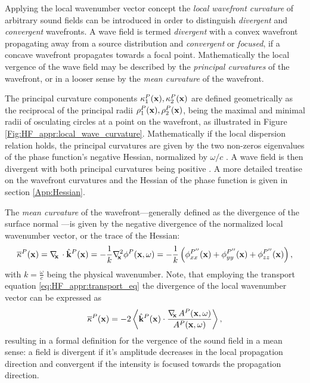 Applying the local wavenumber vector concept the \emph{local wavefront curvature} of arbitrary sound fields can be introduced in order to distinguish \emph{divergent} and \emph{convergent} wavefronts.
A wave field is termed \emph{divergent} with a convex wavefront propagating away from a source distribution and \emph{convergent} or \emph{focused}, if a concave wavefront propagates towards a focal point.
Mathematically the local vergence of the wave field may be described by the \emph{principal curvatures} of the wavefront, or in a looser sense by the \emph{mean curvature} of the wavefront.

The principal curvature components $\kappa_1^P(\mathbf{x}),\kappa_2^P(\mathbf{x})$ are defined geometrically as the reciprocal of the principal radii $\rho_1^P(\mathbf{x}), \rho_2^P(\mathbf{x})$, being the maximal and minimal radii of osculating circles at a point on the wavefront, as illustrated in Figure \ref{Fig:HF_appr:local_wave_curvature}.
Mathematically if the local dispersion relation holds, the principal curvatures are given by the two non-zeros eigenvalues of the phase function's negative Hessian, normalized by $\omega/c$ \cite{Hartmann1999, Hartmann2001}.
A wave field is then divergent with both principal curvatures being positive \cite{Arnold1986, Bleistein1984, HF_and_Pulse_Scattering1992}.
A more detailed treatise on the wavefront curvatures and the Hessian of the phase function is given in section \ref{App:Hessian}.

The \emph{mean curvature} of the wavefront---generally defined as the divergence of the surface normal \cite{Goldman2005}---is given by the negative divergence of the normalized local wavenumber vector, or the trace of the Hessian:
%
\begin{equation}
\overline{\kappa}^P(\mathbf{x}) = \nabla_{\!\!\mathbf{x}}\, \cdot \hat{\mathbf{k}}^P(\mathbf{x}) = - \frac{1}{k} \nabla^2_{\!\!\mathbf{x}} \phi^P(\mathbf{x},\omega) = -\frac{1}{k} \left(  \phi^{P''}_{xx}(\mathbf{x}) + \phi^{P''}_{yy}(\mathbf{x}) + \phi^{P''}_{zz}(\mathbf{x}) \right),
\label{eq:HF_appr:curvature}
\end{equation}
with $k = \frac{\omega}{c}$ being the physical wavenumber.
Note, that employing the transport equation \eqref{eq:HF_appr:transport_eq} the divergence of the local wavenumber vector can be expressed as
\begin{equation}
\overline{\kappa}^P(\mathbf{x}) = -2 \left< \hat{\mathbf{k}}^P(\mathbf{x})\cdot \frac{ \nabla_{\!\!\mathbf{x}}\, A^P(\mathbf{x},\omega) }{A^P(\mathbf{x},\omega)}\right>,
\end{equation}
resulting in a formal definition for the vergence of the sound field in a mean sense: a field is divergent if it's amplitude decreases in the local propagation direction and convergent if the intensity is focused towards the propagation direction.

